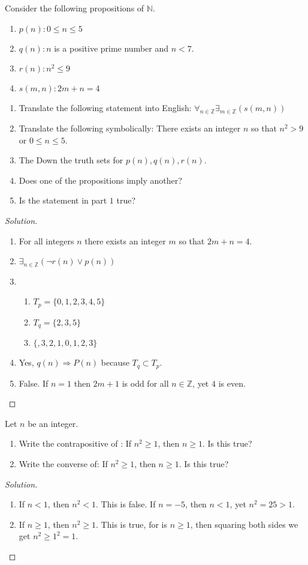 \documentclass[../main.tex]{subfiles}
\begin{document}
\begin{problem}
Consider the following propositions of $\mathbb{N}$.
\begin{enumerate}
\item[] $p(n): 0\leq n \leq 5$
\item[] $q(n): n$ is a positive prime number and $n<7$.
\item[] $r(n):  n^2 \leq 9$
\item[] $s(m,n): 2m+n = 4$
\end{enumerate}
\begin{enumerate}
\item Translate the following statement into English: $\forall_{n\in \mathbb{Z}}\exists_{m\in \mathbb{Z}}(s(m,n))$
\item Translate the following symbolically: There exists an integer $n$ so that $n^2>9$ or $0\leq n \leq 5$.
\item The Down the truth sets for $p(n),q(n),r(n)$.
\item Does one of the propositions imply another?
\item Is the statement in part $1$ true?
\end{enumerate}
\end{problem}
\begin{proof}[Solution]
\
\begin{enumerate}
\item For all integers $n$ there exists an integer $m$ so that $2m+n = 4$. 
\item $\exists_{n\in \mathbb{Z}}(\neg r(n)\lor p(n))$
\item
\begin{enumerate}
\item $T_{p} = \{0,1,2,3,4,5\}$
\item $T_{q} = \{2,3,5\}$
\item $\{,3,2,1,0,1,2,3\}$
\end{enumerate}
\item Yes, $q(n)\Rightarrow P(n)$ because $T_{q}\subset T_{p}$.
\item False. If $n = 1$ then $2m+1$ is odd for all $n\in \mathbb{Z}$, yet $4$ is even.
\end{enumerate}
\end{proof}

\begin{problem}
Let $n$ be an integer.
\begin{enumerate}
\item Write the contrapositive of : If $n^2 \geq 1$, then $n\geq 1$. Is this true?
\item Write the converse of: If $n^2 \geq 1$, then $n\geq 1$. Is this true?
\end{enumerate}
\end{problem}
\begin{proof}[Solution]
\
\begin{enumerate}
\item If $n < 1$, then $n^2 <1$. This is false. If $n = -5$, then $n<1$, yet $n^2 = 25 >1$.
\item If $n\geq 1$, then $n^2 \geq 1$. This is true, for is $n\geq 1$, then squaring both sides we get $n^2 \geq 1^2 = 1$. 
\end{enumerate}
\end{proof}
\end{document}
